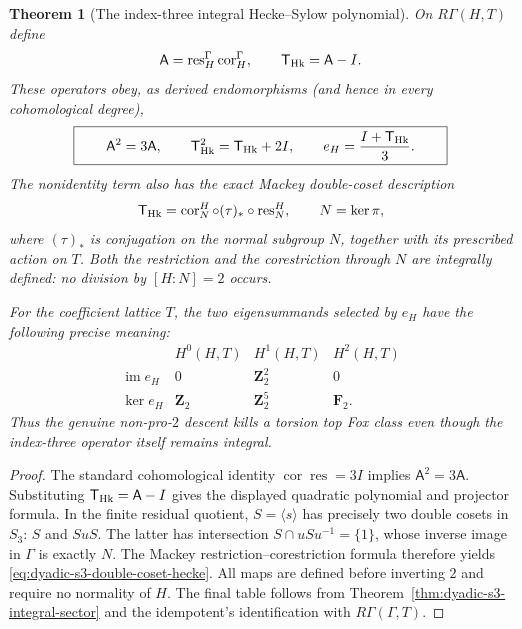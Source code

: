 \documentclass[11pt]{article}
\newtheorem{theorem}{Theorem}[section]
\theoremstyle{definition}
\begin{document}
\begin{theorem}[The index-three integral Hecke--Sylow polynomial]
\label{thm:dyadic-s3-hecke-sylow-polynomial}
On $R\Gamma(H,T)$ define
\begin{equation}\label{eq:dyadic-s3-hecke-operator}
\mathsf A=\operatorname{res}_H^\Gamma
\operatorname{cor}_H^\Gamma,
\qquad
\mathsf T_{\rm Hk}=\mathsf A-I.
\end{equation}
These operators obey, as derived
endomorphisms (and hence in every
cohomological degree),
\begin{equation}\label{eq:dyadic-s3-hecke-minpoly}
\boxed{\qquad
\mathsf A^2=3\mathsf A,\qquad
\mathsf T_{\rm Hk}^2=
\mathsf T_{\rm Hk}+2I,\qquad
e_H=\frac{I+\mathsf T_{\rm Hk}}3.
\qquad}
\end{equation}
The nonidentity term also has
the exact Mackey double-coset
description
\begin{equation}\label{eq:dyadic-s3-double-coset-hecke}
\mathsf T_{\rm Hk}=
\operatorname{cor}_N^H\circ
(\tau)_*\circ
\operatorname{res}_N^H,
\qquad N=\ker\pi,
\end{equation}
where $(\tau)_*$ is conjugation on
the normal subgroup $N$, together
with its prescribed action on $T$.
Both the restriction and the
corestriction through $N$ are
integrally defined: no division
by $[H:N]=2$ occurs.

For the coefficient lattice $T$,
the two eigensummands selected by
$e_H$ have the following precise
meaning:
\[
\begin{array}{c|ccc}
& H^0(H,T)&H^1(H,T)&H^2(H,T)\\ \hline
\operatorname{im}e_H&0&\mathbf Z_2^2&0\\
\ker e_H&\mathbf Z_2&\mathbf Z_2^5&\mathbf F_2.
\end{array}
\]
Thus the genuine non-pro-$2$
descent kills a torsion top Fox
class even though the index-three
operator itself remains integral.
\end{theorem}

\begin{proof}
The standard cohomological identity
$\operatorname{cor}\operatorname{res}
=3I$ implies
$\mathsf A^2=3\mathsf A$.
Substituting $\mathsf T_{\rm Hk}=\mathsf A-I$
gives the displayed quadratic
polynomial and projector formula.
In the finite residual quotient,
$S=\langle s\rangle$ has precisely
two double cosets in $S_3$:
$S$ and $SuS$.  The latter
has intersection
$S\cap uSu^{-1}=\{1\}$,
whose inverse image in $\Gamma$
is exactly $N$.
The Mackey restriction--corestriction
formula therefore yields
\eqref{eq:dyadic-s3-double-coset-hecke}.
All maps are defined before
inverting $2$ and require no
normality of $H$.
The final table follows from
Theorem~\ref{thm:dyadic-s3-integral-sector}
and the idempotent's identification
with $R\Gamma(\Gamma,T)$.
\end{proof}
\end{document}
